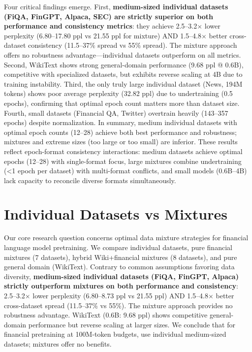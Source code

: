 Four critical findings emerge. First, \textbf{medium-sized individual datasets (FiQA, FinGPT, Alpaca, SEC) are strictly superior on both performance and consistency metrics}: they achieve 2.5–3.2$\times$ lower perplexity (6.80–17.80 ppl vs 21.55 ppl for mixture) AND 1.5–4.8$\times$ better cross-dataset consistency (11.5–37\% spread vs 55\% spread). The mixture approach offers no robustness advantage—individual datasets outperform on all metrics. Second, WikiText shows strong general-domain performance (9.68 ppl @ 0.6B), competitive with specialized datasets, but exhibits reverse scaling at 4B due to training instability. Third, the only truly large individual dataset (News, 194M tokens) shows poor average perplexity (32.82 ppl) due to undertraining (0.5 epochs), confirming that optimal epoch count matters more than dataset size. Fourth, small datasets (Financial QA, Twitter) overtrain heavily (143–357 epochs) despite normalization. In summary, medium individual datasets with optimal epoch counts (12–28) achieve both best performance and robustness; mixtures and extreme sizes (too large or too small) are inferior. These results reflect epoch-format consistency interactions: medium datasets achieve optimal epochs (12–28) with single-format focus, large mixtures combine undertraining (<1 epoch per dataset) with multi-format conflicts, and small models (0.6B–4B) lack capacity to reconcile diverse formats simultaneously.

\section{Individual Datasets vs Mixtures}

Our core research question concerns optimal data mixture strategies for financial language model pretraining. We compare individual datasets, pure financial mixtures (7 datasets), hybrid Wiki+financial mixtures (8 datasets), and pure general domain (WikiText). Contrary to common assumptions favoring data diversity, \textbf{medium-sized individual datasets (FiQA, FinGPT, Alpaca) strictly outperform mixtures on both performance and consistency}: 2.5–3.2$\times$ lower perplexity (6.80–8.73 ppl vs 21.55 ppl) AND 1.5–4.8$\times$ better cross-dataset spread (11.5–37\% vs 55\%). The mixture approach provides no robustness advantage. WikiText (0.6B: 9.68 ppl) shows competitive general-domain performance but reverse scaling at larger sizes. We conclude that for financial pretraining at 100M-token budgets, use individual medium-sized datasets; mixtures offer no benefits.

